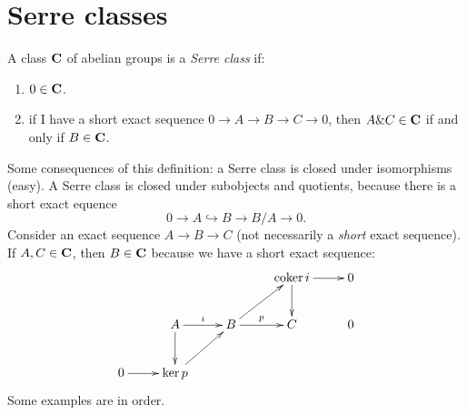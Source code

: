 \section{Serre classes}\label{section-serre-classes}
\begin{definition}\label{serre-class}
    A class $\mathbf C$ of abelian groups is a \emph{Serre class} if:
    \begin{enumerate}
	\setcounter{enumi}{0}
	\item $0\in \mathbf C$.
	\item if I have a short exact sequence $0\to A\to B\to C\to 0$, then
	    $A\& C\in \mathbf C$ if and only if $B\in\mathbf C$.
    \end{enumerate}
\end{definition}
Some consequences of this definition: a Serre class is closed under
isomorphisms (easy). A Serre class is closed under subobjects and quotients,
because there is a short exact equence
$$0\to A\hookrightarrow B \to B/A\to 0.$$
Consider an exact sequence $A\to B\to C$ (not necessarily a \emph{short} exact
sequence). If $A,C\in \mathbf C$, then $B\in \mathbf C$ because we have a short exact
sequence:
$$
\xymatrix{
    & & & \coker i\ar[d]\ar[r] & 0\\
    & A\ar[r]^i\ar[d] & B\ar[r]^p\ar[ur] & C & 0\\
    0\ar[r] & \ker p\ar[ur] & & & 
}
$$
Some examples are in order.
